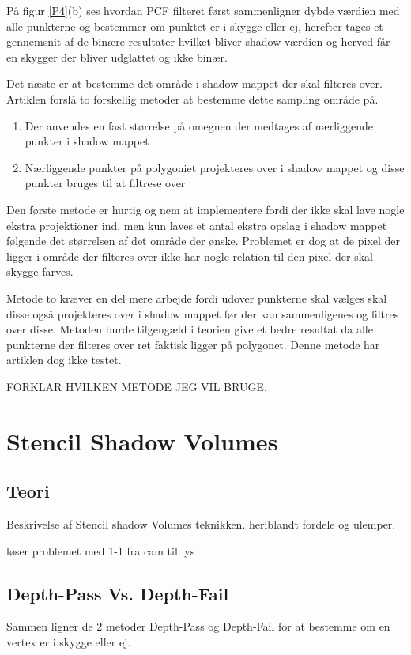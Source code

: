 \documentclass[11pt,a4paper]{article}
\begin{document}
På figur \ref{P4}(b) ses hvordan PCF filteret først sammenligner dybde værdien med alle punkterne og bestemmer om punktet er i skygge eller ej, herefter tages et gennemsnit af de binære resultater hvilket bliver shadow værdien og herved får en skygger der bliver udglattet og ikke binær.


Det næste er at bestemme det område i shadow mappet der skal filteres over. Artiklen \cite{PCF} forslå to forskellig metoder at bestemme dette sampling område på.

\begin{enumerate}
\item Der anvendes en fast størrelse på omegnen der medtages af nærliggende punkter i shadow mappet
\item Nærliggende punkter på polygoniet projekteres over i shadow mappet og disse punkter bruges til at filtrese over
\end{enumerate}

Den første metode er hurtig og nem at implementere fordi der ikke skal lave nogle ekstra projektioner ind, men kun laves et antal ekstra opslag i shadow mappet følgende det størrelsen af det område der ønske. Problemet er dog at de pixel der ligger i område der filteres over ikke har nogle relation til den pixel der skal skygge farves.

Metode to kræver en del mere arbejde fordi udover punkterne skal vælges skal disse også projekteres over i shadow mappet før der kan sammenligenes og filtres over disse. Metoden burde tilgengæld i teorien give et bedre resultat da alle punkterne der filteres over ret faktisk ligger på polygonet. Denne metode har artiklen  \cite{PCF} dog ikke testet.

FORKLAR HVILKEN METODE JEG VIL BRUGE.



\newpage 
\section{Stencil Shadow Volumes}

\subsection{Teori}
Beskrivelse af Stencil shadow Volumes teknikken. heriblandt fordele og ulemper.

løser problemet med 1-1 fra cam til lys

\subsection{Depth-Pass Vs. Depth-Fail}
Sammen ligner de 2 metoder Depth-Pass og Depth-Fail for at bestemme om en vertex er i skygge eller ej.
\end{document}
